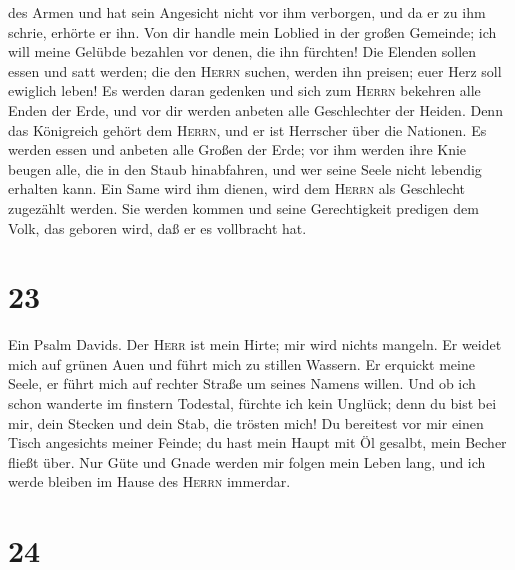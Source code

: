 des Armen und hat sein Angesicht nicht vor ihm verborgen, und da er zu
ihm schrie, erhörte er ihn.  Von dir handle mein Loblied
in der großen Gemeinde; ich will meine Gelübde bezahlen vor denen, die
ihn fürchten!  Die Elenden sollen essen und satt werden;
die den \textsc{Herrn} suchen, werden ihn preisen; euer Herz soll
ewiglich leben!  Es werden daran gedenken und sich zum
\textsc{Herrn} bekehren alle Enden der Erde, und vor dir werden anbeten
alle Geschlechter der Heiden.  Denn das Königreich gehört
dem \textsc{Herrn}, und er ist Herrscher über die Nationen.
 Es werden essen und anbeten alle Großen der Erde; vor
ihm werden ihre Knie beugen alle, die in den Staub hinabfahren, und wer
seine Seele nicht lebendig erhalten kann.  Ein Same wird
ihm dienen, wird dem \textsc{Herrn} als Geschlecht zugezählt werden.
 Sie werden kommen und seine Gerechtigkeit predigen dem
Volk, das geboren wird, daß er es vollbracht hat.

\hypertarget{section-22}{%
\section{23}\label{section-22}}

 Ein Psalm Davids. Der \textsc{Herr} ist mein Hirte; mir
wird nichts mangeln.  Er weidet mich auf grünen Auen und
führt mich zu stillen Wassern.  Er erquickt meine Seele,
er führt mich auf rechter Straße um seines Namens willen. 
Und ob ich schon wanderte im finstern Todestal, fürchte ich kein
Unglück; denn du bist bei mir, dein Stecken und dein Stab, die trösten
mich!  Du bereitest vor mir einen Tisch angesichts meiner
Feinde; du hast mein Haupt mit Öl gesalbt, mein Becher fließt über.
 Nur Güte und Gnade werden mir folgen mein Leben lang, und
ich werde bleiben im Hause des \textsc{Herrn} immerdar.

\hypertarget{section-23}{%
\section{24}\label{section-23}}

